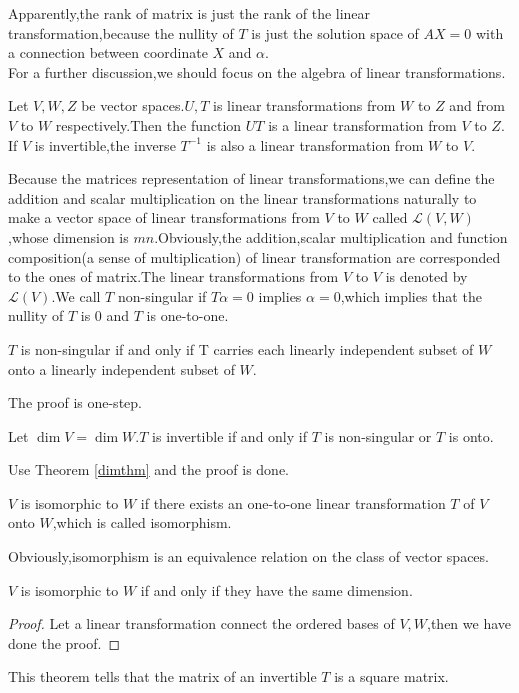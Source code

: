 \documentclass{article}
\begin{document}
Apparently,the rank of matrix is just the rank of the linear transformation,because the nullity of $T$ is just the solution space of $AX=0$ with a connection between coordinate $X$ and $\alpha$.\\
For a further discussion,we should focus on the algebra of linear transformations.
\begin{thm}
	Let $V,W,Z$ be vector spaces.$U,T$ is linear transformations from $W$ to $Z$ and from $V$ to $W$ respectively.Then the function $UT$ is a linear transformation from $V$ to $Z$. If $V$ is invertible,the inverse $T^{-1}$ is also a linear transformation from $W$ to $V$.
\end{thm}
Because the matrices representation of linear transformations,we can define the addition and scalar multiplication on the linear transformations naturally to make a vector space of linear transformations from $V$ to $W$ called $\mathcal{L}(V,W)$,whose dimension is $mn$.Obviously,the addition,scalar multiplication and function composition(a sense of multiplication) of linear transformation are corresponded to the ones of matrix.The linear transformations from $V$ to $V$ is denoted by $\mathcal{L}(V)$.We call $T$ non-singular if $T\alpha=0$ implies $\alpha=0$,which implies that the nullity of $T$ is $0$ and $T$ is one-to-one.
\begin{thm}
	$T$ is non-singular if and only if T carries each linearly independent subset of $W$ onto a linearly independent subset of $W$. 
\end{thm}
The proof is one-step.
\begin{thm}\label{invertiblelineartransformation}
	Let $\dim V=\dim W$.$T$ is invertible if and only if $T$ is non-singular or $T$ is onto.
\end{thm}
Use Theorem \ref{dimthm} and the proof is done.
\begin{dde}
	$V$ is isomorphic to $W$ if there exists an one-to-one linear transformation $T$ of $V$ onto $W$,which is called isomorphism.
\end{dde}
Obviously,isomorphism is an equivalence relation on the class of vector spaces.
\begin{thm}
	$V$ is isomorphic to $W$ if and only if they have the same dimension.
\end{thm}
\begin{proof}
	Let a linear transformation connect the ordered bases of $V,W$,then we have done the proof.
\end{proof}
This theorem tells that the matrix of an invertible $T$ is a square matrix.
\end{document}
